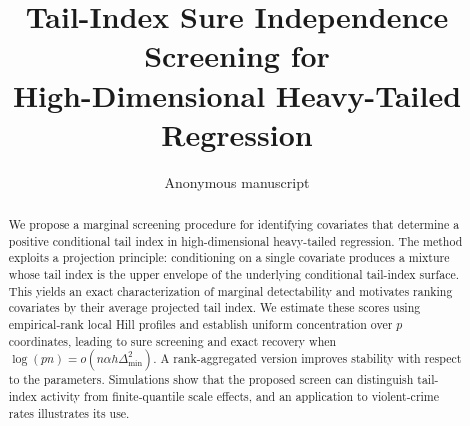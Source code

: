 \documentclass[11pt]{article}
\title{Tail-Index Sure Independence Screening for\\High-Dimensional Heavy-Tailed Regression}
\author{Anonymous manuscript}\date{}
\theoremstyle{remark}\newtheorem{remark}[theorem]{Remark}
\begin{document}
\maketitle
\begin{abstract} We propose a marginal screening procedure for identifying covariates that determine a positive conditional tail index in high-dimensional heavy-tailed regression. The method exploits a projection principle: conditioning on a single covariate produces a mixture whose tail index is the upper envelope of the underlying conditional tail-index surface. This yields an exact characterization of marginal detectability and motivates ranking covariates by their average projected tail index. We estimate these scores using empirical-rank local Hill profiles and establish uniform concentration over $p$ coordinates, leading to sure screening and exact recovery when $\log(pn)=o(n\alpha h\Delta_{\min}^2)$. A rank-aggregated version improves stability with respect to the parameters. Simulations show that the proposed screen can distinguish tail-index activity from finite-quantile scale effects, and an application to violent-crime rates illustrates its use. 
\end{abstract}




\FloatBarrier

\FloatBarrier

\appendix


\end{document}
